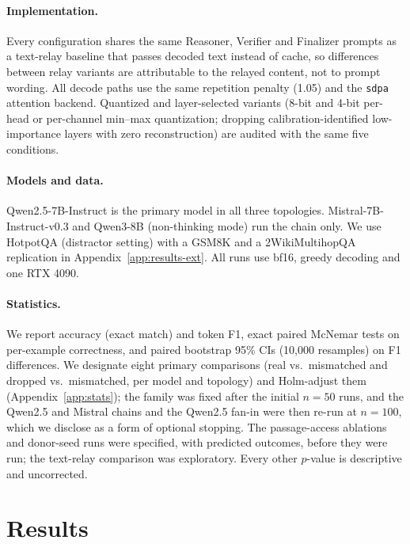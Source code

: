 \documentclass[11pt]{article}
\begin{document}
\paragraph{Implementation.} Every configuration shares the same
Reasoner, Verifier and Finalizer prompts as a text-relay baseline that
passes decoded text instead of cache, so differences between relay
variants are attributable to the relayed content, not to prompt wording.
All decode paths use the same repetition penalty (1.05) and the
\texttt{sdpa} attention backend. Quantized and layer-selected variants
(8-bit and 4-bit per-head or per-channel min--max quantization; dropping
calibration-identified low-importance layers with zero reconstruction) are
audited with the same five conditions.

\paragraph{Models and data.} Qwen2.5-7B-Instruct \citep{qwen2p5_2024} is
the primary model in all three topologies. Mistral-7B-Instruct-v0.3
\citep{mistral7b2023} and Qwen3-8B \citep{qwen3_2025} (non-thinking mode)
run the chain only. We use HotpotQA (distractor setting) with a GSM8K
\citep{gsm8k2021} and a 2WikiMultihopQA replication in
Appendix~\ref{app:results-ext}. All runs use bf16, greedy decoding and one
RTX 4090.

\paragraph{Statistics.} We report accuracy (exact match) and token F1,
exact paired McNemar tests on per-example correctness, and paired
bootstrap 95\% CIs (10{,}000 resamples) on F1 differences. We designate
eight primary comparisons (real vs.\ mismatched and dropped vs.\
mismatched, per model and topology) and Holm-adjust them
(Appendix~\ref{app:stats}); the family was fixed after the initial
$n{=}50$ runs, and the Qwen2.5 and Mistral chains and the Qwen2.5 fan-in were
then re-run at $n{=}100$, which we disclose as a form of optional stopping. The
passage-access ablations and donor-seed runs were specified, with predicted
outcomes, before they were run; the text-relay comparison was exploratory. Every
other $p$-value is descriptive and uncorrected.

\section{Results}
\label{sec:results}
\end{document}
